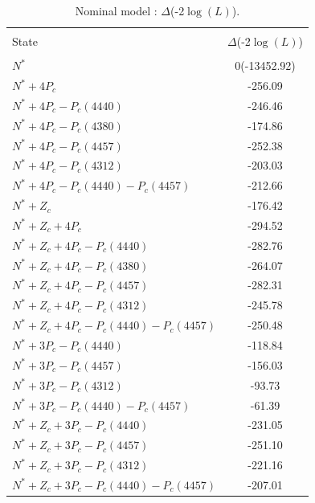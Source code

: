 \begin{table}[htb]
\centering
\caption{ Nominal model : $\Delta$(-2$\log(L)$). }
\label{tab:LL_nor}
\vspace{0.2cm}
\begin{tabular}{lc }
\hline\\[-2.5ex]
 State                                  &   $\Delta$(-2$\log(L)$)  \\
 \hline \\[-2.5ex]
 $N^*$                                  &   0(-13452.92)    \\
 $N^*+4P_c$                             &   -256.09    \\
 $N^*+4P_c-P_c(4440)$                   &   -246.46    \\
 $N^*+4P_c-P_c(4380)$                   &   -174.86    \\
 $N^*+4P_c-P_c(4457)$                   &   -252.38    \\
 $N^*+4P_c-P_c(4312)$                   &   -203.03    \\
 $N^*+4P_c-P_c(4440)-P_c(4457)$         &   -212.66    \\
 \hline
 $N^*+Z_c$                              &   -176.42    \\
 $N^*+Z_c+4P_c$                         &   -294.52    \\
 $N^*+Z_c+4P_c-P_c(4440)$               &   -282.76    \\
 $N^*+Z_c+4P_c-P_c(4380)$               &   -264.07    \\
 $N^*+Z_c+4P_c-P_c(4457)$               &   -282.31    \\
 $N^*+Z_c+4P_c-P_c(4312)$               &   -245.78    \\
 $N^*+Z_c+4P_c-P_c(4440)-P_c(4457)$     &   -250.48    \\
\hline
 $N^*+3P_c-P_c(4440)$                   &   -118.84    \\
 $N^*+3P_c-P_c(4457)$                   &   -156.03    \\
 $N^*+3P_c-P_c(4312)$                   &   -93.73     \\
 $N^*+3P_c-P_c(4440)-P_c(4457)$         &   -61.39     \\
\hline
 $N^*+Z_c+3P_c-P_c(4440)$               &   -231.05    \\
 $N^*+Z_c+3P_c-P_c(4457)$               &   -251.10    \\
 $N^*+Z_c+3P_c-P_c(4312)$               &   -221.16    \\
 $N^*+Z_c+3P_c-P_c(4440)-P_c(4457)$     &   -207.01    \\
 \hline
\end{tabular}
\end{table}


